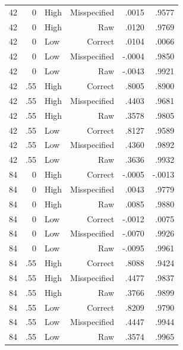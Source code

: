 \begin{longtable}{rrlrrr}
42 & 0 & High & Misspecified & .0015 & .9577 \\
42 & 0 & High & Raw & .0120 & .9769 \\
42 & 0 & Low & Correct & .0104 & .0066 \\
42 & 0 & Low & Misspecified & -.0004 & .9850 \\
42 & 0 & Low & Raw & -.0043 & .9921 \\
42 & .55 & High & Correct & .8005 & .8900 \\
42 & .55 & High & Misspecified & .4403 & .9681 \\
42 & .55 & High & Raw & .3578 & .9805 \\
42 & .55 & Low & Correct & .8127 & .9589 \\
42 & .55 & Low & Misspecified & .4360 & .9892 \\
42 & .55 & Low & Raw & .3636 & .9932 \\
84 & 0 & High & Correct & -.0005 & -.0013 \\
84 & 0 & High & Misspecified & .0043 & .9779 \\
84 & 0 & High & Raw & .0085 & .9880 \\
84 & 0 & Low & Correct & -.0012 & .0075 \\
84 & 0 & Low & Misspecified & -.0070 & .9926 \\
84 & 0 & Low & Raw & -.0095 & .9961 \\
84 & .55 & High & Correct & .8088 & .9424 \\
84 & .55 & High & Misspecified & .4477 & .9837 \\
84 & .55 & High & Raw & .3766 & .9899 \\
84 & .55 & Low & Correct & .8209 & .9790 \\
84 & .55 & Low & Misspecified & .4447 & .9944 \\
84 & .55 & Low & Raw & .3574 & .9965 \\
\bottomrule
\end{longtable}
\endgroup
